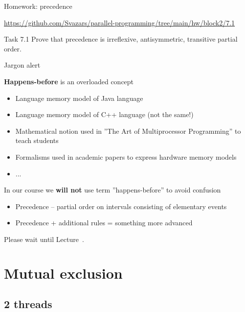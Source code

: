 \begin{frame}{Homework: precedence}

{\small\url{https://github.com/Svazars/parallel-programming/tree/main/hw/block2/7.1}}
\begin{homeworkmail}{Task 7.1}
    Prove that precedence is irreflexive, antisymmetric, transitive partial order.
\end{homeworkmail}

\end{frame}

\begin{frame}{Jargon alert}

\textbf{Happens-before} is an overloaded concept
\begin{itemize}
  \pause \item Language memory model of Java language
  \pause \item Language memory model of C++ language (not the same!)
  \pause \item Mathematical notion used in ''The Art of Multiprocessor Programming'' to teach students
  \pause \item Formalisms used in academic papers to express hardware memory models
  \pause \item ...
\end{itemize}

\pause 
In our course we \textbf{will not} use term ''happens-before'' to avoid confusion

\begin{itemize}
  \pause \item Precedence -- partial order on intervals consisting of elementary events
  \pause \item Precedence + additional rules = something more advanced
\end{itemize}

\pause
Please wait until Lecture~\langMMNum.

\end{frame}

\section{Mutual exclusion}
\showTOC

\subsection{2 threads}

